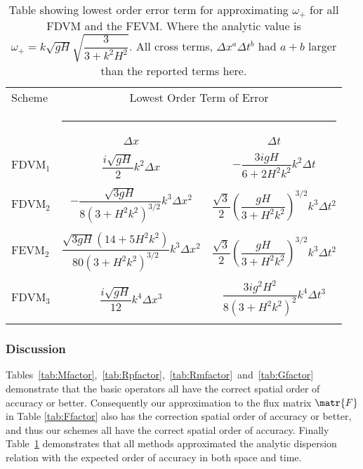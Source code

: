 \begin{table}
	\centering   
	\begin{tabular}{l  c  c}
		Scheme & \multicolumn{2}{c}{Lowest Order Term of Error}\\
		&  \multicolumn{2}{l}{\rule{0.95\textwidth}{0.4pt}} \\
		& $\Delta x$&$\Delta t$\\
		\hline && \\
		$\text{FDVM}_1$& $\dfrac{i\sqrt{gH}}{2}k^2\Delta x$ & $-\dfrac{3igH}{6 + 2H^2k^2}k^2\Delta t$ \\ & & \\
		$\text{FDVM}_2$& $-\dfrac{\sqrt{3gH}}{8\left(3 + H^2k^2\right)^{3/2}}k^3\Delta x^2$ & $\dfrac{\sqrt{3}}{2}\left(\dfrac{gH}{3 + H^2k^2}\right)^{3/2} k^3\Delta t^2$ \\ & & \\
		$\text{FEVM}_2$& $\dfrac{\sqrt{3gH}\left(14 + 5H^2k^2\right)}{80\left(3 + H^2k^2\right)^{3/2}}k^3\Delta x^2$ & $\dfrac{\sqrt{3}}{2}\left(\dfrac{gH}{3 + H^2k^2}\right)^{3/2}k^3\Delta t^2$  \\ & & \\
		$\text{FDVM}_3$& $\dfrac{i\sqrt{gH}}{12}k^4\Delta x^3$ & $\dfrac{3ig^2H^2}{8\left(3 + H^2k^2\right)^2} k^4\Delta t^3$  \\ & & \\ 
	\end{tabular}
	\caption{Table showing lowest order error term for approximating $\omega_+$ for all FDVM and the FEVM. Where the analytic value is  $\omega_+ = k\sqrt{gH}\sqrt{\dfrac{3}{3 + k^2H^2}}$. All cross terms, $\Delta x^a \Delta t^b$ had $a +b$ larger than the reported terms here.}
	\label{tab:Wfactor} 
\end{table}


\subsubsection{Discussion} 
Tables~\ref{tab:Mfactor},~\ref{tab:Rpfactor},~\ref{tab:Rmfactor}~and~\ref{tab:Gfactor} demonstrate that the basic operators all have the correct spatial order of accuracy or better. Consequently our approximation to the flux matrix $\matr{F}$ in Table \ref{tab:Ffactor} also has the correction spatial order of accuracy or better, and thus our schemes all have the correct spatial order of accuracy. Finally Table~\ref{tab:Wfactor} demonstrates that all methods approximated the analytic dispersion relation with the expected order of accuracy in both space and time.

